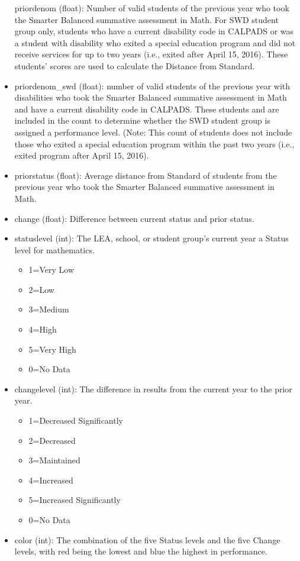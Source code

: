 \documentclass[11pt]{article}
\providecommand{\tightlist}{%
      \setlength{\itemsep}{0pt}\setlength{\parskip}{0pt}}
\begin{document}
\begin{itemize}
  priordenom (float): Number of valid students of the previous year who
  took the Smarter Balanced summative assessment in Math. For SWD
  student group only, students who have a current disability code in
  CALPADS or was a student with disability who exited a special
  education program and did not receive services for up to two years
  (i.e., exited after April 15, 2016). These students' scores are used
  to calculate the Distance from Standard.
\item
  priordenom\_swd (float): number of valid students of the previous year
  with disabilities who took the Smarter Balanced summative assessment
  in Math and have a current disability code in CALPADS. These students
  and are included in the count to determine whether the SWD student
  group is assigned a performance level. (Note: This count of students
  does not include those who exited a special education program within
  the past two years (i.e., exited program after April 15, 2016).
\item
  priorstatus (float): Average distance from Standard of students from
  the previous year who took the Smarter Balanced summative assessment
  in Math.
\item
  change (float): Difference between current status and prior status.
\item
  statuslevel (int): The LEA, school, or student group's current year a
  Status level for mathematics.

  \begin{itemize}
  \tightlist
  \item
    1=Very Low
  \item
    2=Low
  \item
    3=Medium
  \item
    4=High
  \item
    5=Very High
  \item
    0=No Data
  \end{itemize}
\item
  changelevel (int): The difference in results from the current year to
  the prior year.

  \begin{itemize}
  \tightlist
  \item
    1=Decreased Significantly
  \item
    2=Decreased
  \item
    3=Maintained
  \item
    4=Increased
  \item
    5=Increased Significantly
  \item
    0=No Data
  \end{itemize}
\item
  color (int): The combination of the five Status levels and the five
  Change levels, with red being the lowest and blue the highest in
  performance.


\end{itemize}
\end{document}
